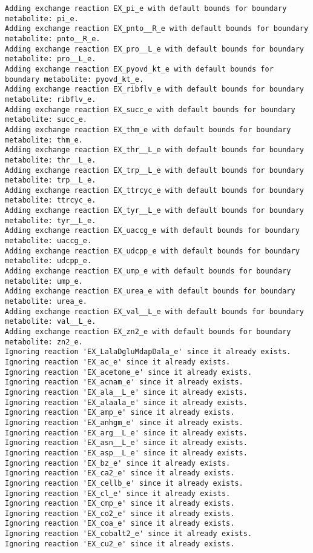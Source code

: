 \documentclass[
  letterpaper,
  DIV=11,
  numbers=noendperiod]{scrartcl}
\begin{document}
\begin{verbatim}
Adding exchange reaction EX_pi_e with default bounds for boundary metabolite: pi_e.
Adding exchange reaction EX_pnto__R_e with default bounds for boundary metabolite: pnto__R_e.
Adding exchange reaction EX_pro__L_e with default bounds for boundary metabolite: pro__L_e.
Adding exchange reaction EX_pyovd_kt_e with default bounds for boundary metabolite: pyovd_kt_e.
Adding exchange reaction EX_ribflv_e with default bounds for boundary metabolite: ribflv_e.
Adding exchange reaction EX_succ_e with default bounds for boundary metabolite: succ_e.
Adding exchange reaction EX_thm_e with default bounds for boundary metabolite: thm_e.
Adding exchange reaction EX_thr__L_e with default bounds for boundary metabolite: thr__L_e.
Adding exchange reaction EX_trp__L_e with default bounds for boundary metabolite: trp__L_e.
Adding exchange reaction EX_ttrcyc_e with default bounds for boundary metabolite: ttrcyc_e.
Adding exchange reaction EX_tyr__L_e with default bounds for boundary metabolite: tyr__L_e.
Adding exchange reaction EX_uaccg_e with default bounds for boundary metabolite: uaccg_e.
Adding exchange reaction EX_udcpp_e with default bounds for boundary metabolite: udcpp_e.
Adding exchange reaction EX_ump_e with default bounds for boundary metabolite: ump_e.
Adding exchange reaction EX_urea_e with default bounds for boundary metabolite: urea_e.
Adding exchange reaction EX_val__L_e with default bounds for boundary metabolite: val__L_e.
Adding exchange reaction EX_zn2_e with default bounds for boundary metabolite: zn2_e.
Ignoring reaction 'EX_LalaDgluMdapDala_e' since it already exists.
Ignoring reaction 'EX_ac_e' since it already exists.
Ignoring reaction 'EX_acetone_e' since it already exists.
Ignoring reaction 'EX_acnam_e' since it already exists.
Ignoring reaction 'EX_ala__L_e' since it already exists.
Ignoring reaction 'EX_alaala_e' since it already exists.
Ignoring reaction 'EX_amp_e' since it already exists.
Ignoring reaction 'EX_anhgm_e' since it already exists.
Ignoring reaction 'EX_arg__L_e' since it already exists.
Ignoring reaction 'EX_asn__L_e' since it already exists.
Ignoring reaction 'EX_asp__L_e' since it already exists.
Ignoring reaction 'EX_bz_e' since it already exists.
Ignoring reaction 'EX_ca2_e' since it already exists.
Ignoring reaction 'EX_cellb_e' since it already exists.
Ignoring reaction 'EX_cl_e' since it already exists.
Ignoring reaction 'EX_cmp_e' since it already exists.
Ignoring reaction 'EX_co2_e' since it already exists.
Ignoring reaction 'EX_coa_e' since it already exists.
Ignoring reaction 'EX_cobalt2_e' since it already exists.
Ignoring reaction 'EX_cu2_e' since it already exists.

\end{verbatim}
\end{document}
